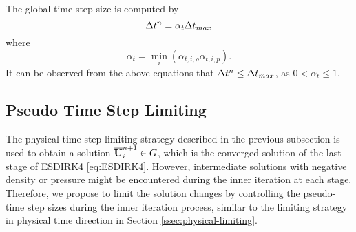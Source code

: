 The global time step size is computed by
\begin{equation}
    \mathrm\Delta t^n = \alpha_t \mathrm\Delta t_{max}
\end{equation}
where
\begin{equation}
    \alpha_t = \min_i(\alpha_{t,i,\rho}\alpha_{t,i,p}).
\end{equation}
It can be observed from the above equations that $\mathrm\Delta t^n \leq \mathrm\Delta t_{max}$, as $0<\alpha_t \leq 1$.

\subsection{Pseudo Time Step Limiting}
\label{ssec:pseudo-limiting}

The physical time step limiting strategy described in the previous subsection is used to obtain a solution $\overline{\mathbf{U}}_i^{n+1} \in G$, which is the converged solution of the last stage of ESDIRK4 \eqref{eq:ESDIRK4}. However, intermediate solutions with negative density or pressure might be encountered during the inner iteration at each stage. Therefore, we propose to limit the solution changes by controlling the pseudo-time step sizes during the inner iteration process, similar to the limiting strategy in physical time direction in Section \ref{ssec:physical-limiting}.

